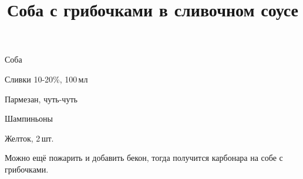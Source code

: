 
\title{Соба с грибочками в сливочном соусе}

\begin{ingredient}
\begin{main}
	\item Соба
	\item Сливки 10-20\%, 100\,мл
	\item Пармезан, чуть-чуть
	\item Шампиньоны
	\item Желток, 2\,шт.
	\item \sout{}
\end{main}
\end{ingredient}
\begin{recipe}


\end{recipe}

\begin{notes}
	Можно ещё пожарить и добавить бекон, тогда получится карбонара на собе с грибочками.
\end{notes}	